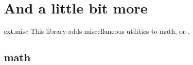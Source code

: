%
%
%

\section{And a little bit more}
\begin{tikzlibrary}{ext.misc}
  This library adds miscellaneous utilities to \pgfname math, \pgfname\space or \tikzname.
\end{tikzlibrary}

\subsection{\pgfname math}

